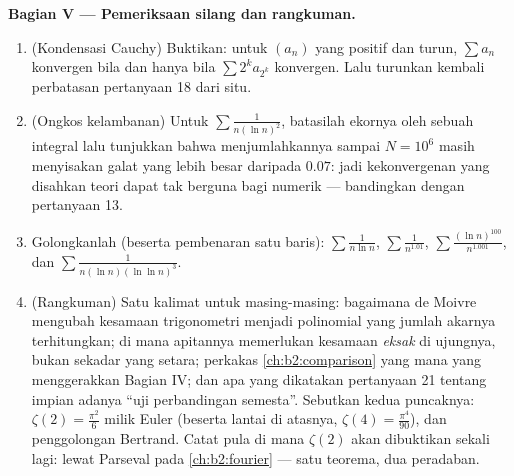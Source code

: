 \begin{problem}[{Soal akhir pekan --- $\zeta(2) = \pi^2/6$ dan
panorama Bertrand}]
\medskip
\noindent\textbf{Bagian V --- Pemeriksaan silang dan rangkuman.}
\begin{enumerate}[resume]
  \item (Kondensasi Cauchy) Buktikan: untuk $(a_n)$ yang positif dan
        turun, $\sum a_n$ konvergen bila dan hanya bila $\sum 2^k a_{2^k}$
        konvergen. Lalu turunkan kembali perbatasan pertanyaan 18 dari situ.
  \item (Ongkos kelambanan) Untuk $\sum\frac1{n(\ln n)^2}$,
        batasilah ekornya oleh sebuah integral lalu tunjukkan bahwa
        menjumlahkannya sampai $N = 10^6$ masih menyisakan galat yang
        lebih besar daripada $0.07$: jadi kekonvergenan yang disahkan
        teori dapat tak berguna bagi numerik --- bandingkan dengan
        pertanyaan 13.
  \item Golongkanlah (beserta pembenaran satu baris):
        $\sum\frac1{n\ln n}$, $\sum\frac1{n^{1.01}}$,
        $\sum\frac{(\ln n)^{100}}{n^{1.001}}$, dan
        $\sum\frac1{n(\ln n)(\ln\ln n)^{3}}$.
  \item (Rangkuman) Satu kalimat untuk masing-masing: bagaimana de
        Moivre mengubah kesamaan trigonometri menjadi polinomial yang
        jumlah akarnya terhitungkan; di mana apitannya memerlukan
        kesamaan \emph{eksak} di ujungnya, bukan sekadar yang setara;
        perkakas \cref{ch:b2:comparison} yang mana yang menggerakkan
        Bagian IV; dan apa yang dikatakan pertanyaan 21 tentang impian
        adanya ``uji perbandingan semesta''. Sebutkan kedua puncaknya:
        $\zeta(2) = \frac{\pi^2}6$ milik Euler (beserta lantai di
        atasnya, $\zeta(4) = \frac{\pi^4}{90}$), dan penggolongan
        Bertrand. Catat pula di mana $\zeta(2)$ akan dibuktikan
        sekali lagi: lewat Parseval pada \cref{ch:b2:fourier} --- satu
        teorema, dua peradaban.

\end{enumerate}
\end{problem}
